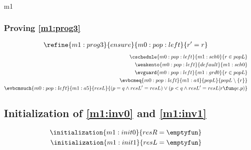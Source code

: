 \documentclass[12pt]{amsart}
\begin{document}
\begin{machine}{m1}
\subsubsection{Proving \ref{m1:prog3}}
\begin{align*}
\refine{m1:prog3}{ensure}{m0:pop:left}{ \index{r}{r' = r} }
\end{align*}
\begin{align*}
\cschedule{m0:pop:left}{m1:sch0}{ r \in popL }
\\ \weakento{m0:pop:left}{default}{m1:sch0}
\\ \evguard{m0:pop:left}{m1:grd0}{ r \in popL }
\\ \evbcmeq{m0:pop:left}{m1:a4}
	{popL}{ popL \setminus \{ r \} }
\\ \evbcmsuch{m0:pop:left}{m1:a5}{resL}
	{ 	 (p = q \land resL' = resL) 
	\lor (p < q \land resL' = resL | r \fun qe.p) }
\end{align*}

\subsection{Initialization of \ref{m1:inv0} and \ref{m1:inv1}}

\begin{align*}
\initialization{m1:init0}{resR = \emptyfun}
\\ \initialization{m1:init1}{resL = \emptyfun}
\end{align*}

\end{machine}
 



\end{document}
